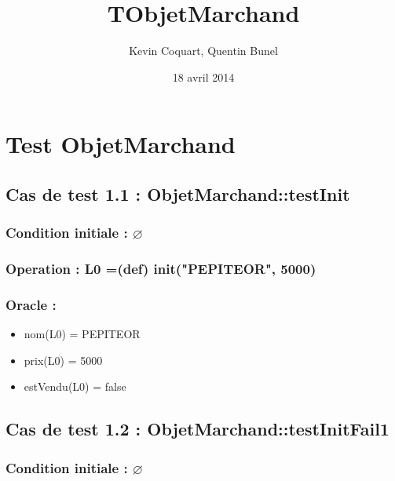 \documentclass[11pt]{article}
\title{TObjetMarchand}
\author{Kevin Coquart, Quentin Bunel}
\date{18 avril 2014}
\begin{document}
\maketitle

\setcounter{tocdepth}{3}
\tableofcontents
\vspace*{1cm}
\section{Test ObjetMarchand}
\label{sec-1}


\subsection{Cas de test 1.1 : ObjetMarchand::testInit}
\label{sec-1.1}

\subsubsection{Condition initiale : $\varnothing$}
\label{sec-1.1.1}

\subsubsection{Operation : L0 =(def) init("PEPITEOR", 5000)}
\label{sec-1.1.2}

\subsubsection{Oracle :}
\label{sec-1.1.3}

\begin{itemize}

\item nom(L0) = PEPITEOR\\
\label{sec-1.1.3.1}


\item prix(L0) = 5000\\
\label{sec-1.1.3.2}


\item estVendu(L0) = false\\
\label{sec-1.1.3.3}


\end{itemize} %
\subsection{Cas de test 1.2 : ObjetMarchand::testInitFail1}
\label{sec-1.2}

\subsubsection{Condition initiale : $\varnothing$}
\label{sec-1.2.1}
\end{document}
